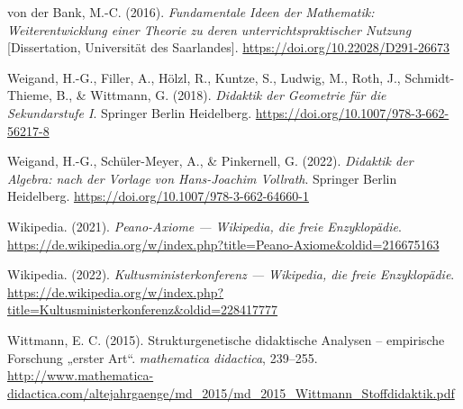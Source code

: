 \documentclass[
]{scrbook}
\newlength{\cslhangindent}
\newenvironment{CSLReferences}[2] %
 {\begin{list}{}{%
  \setlength{\itemindent}{0pt}
  \setlength{\leftmargin}{0pt}
  \setlength{\parsep}{0pt}
  \ifodd #1
   \setlength{\leftmargin}{\cslhangindent}
   \setlength{\itemindent}{-1\cslhangindent}
  \fi
  \setlength{\itemsep}{#2\baselineskip}}}
 {\end{list}}
\theoremstyle{definition}
\theoremstyle{definition}
\theoremstyle{definition}
\theoremstyle{definition}
\theoremstyle{remark}
\begin{document}
\begin{CSLReferences}{1}{0}
von der Bank, M.-C. (2016). \emph{Fundamentale {Ideen} der {Mathematik}: {Weiterentwicklung} einer {Theorie} zu deren unterrichtspraktischer {Nutzung}} {[}Dissertation, Universität des Saarlandes{]}. \url{https://doi.org/10.22028/D291-26673}

Weigand, H.-G., Filler, A., Hölzl, R., Kuntze, S., Ludwig, M., Roth, J., Schmidt-Thieme, B., \& Wittmann, G. (2018). \emph{Didaktik der {Geometrie} für die {Sekundarstufe} {I}}. Springer Berlin Heidelberg. \url{https://doi.org/10.1007/978-3-662-56217-8}

Weigand, H.-G., Schüler-Meyer, A., \& Pinkernell, G. (2022). \emph{Didaktik der {Algebra}: nach der {Vorlage} von {Hans}-{Joachim} {Vollrath}}. Springer Berlin Heidelberg. \url{https://doi.org/10.1007/978-3-662-64660-1}

Wikipedia. (2021). \emph{Peano-Axiome --- Wikipedia{,} die freie Enzyklopädie}. \url{https://de.wikipedia.org/w/index.php?title=Peano-Axiome&oldid=216675163}

Wikipedia. (2022). \emph{Kultusministerkonferenz --- Wikipedia{,} die freie Enzyklopädie}. \url{https://de.wikipedia.org/w/index.php?title=Kultusministerkonferenz&oldid=228417777}

Wittmann, E. C. (2015). Strukturgenetische didaktische {Analysen} -- empirische {Forschung} „erster {Art}``. \emph{mathematica didactica}, 239--255. \url{http://www.mathematica-didactica.com/altejahrgaenge/md_2015/md_2015_Wittmann_Stoffdidaktik.pdf}

\end{CSLReferences}

\end{document}
